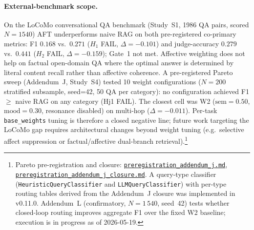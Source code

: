 \documentclass[11pt]{article}
\newcommand{\repourl}{https://github.com/gianlucamazza/emotional-memory}%
\begin{document}
\paragraph{External-benchmark scope.}
On the LoCoMo conversational QA benchmark (Study~S1, 1986 QA pairs, scored
$N=1540$) AFT underperforms naive RAG on both pre-registered co-primary
metrics: F1 $0.168$ vs.\ $0.271$ ($H_1$ FAIL, $\Delta=-0.101$) and
judge-accuracy $0.279$ vs.\ $0.441$ ($H_2$ FAIL, $\Delta=-0.159$);
Gate~1 not met. Affective weighting does not help on factual open-domain
QA where the optimal answer is determined by literal content recall
rather than affective coherence.
A pre-registered Pareto sweep (Addendum~J, Study~S4) tested 10 weight
configurations ($N=200$ stratified subsample, seed=42, 50 QA per category):
no configuration achieved F1 $\geq$ naive RAG on any category (Hj1 FAIL).
The closest cell was W2 ($\text{sem}=0.50$, $\text{mood}=0.30$, resonance
disabled) on multi-hop ($\Delta=-0.011$).
Per-task \texttt{base\_weights} tuning is therefore a closed negative line;
future work targeting the LoCoMo gap requires architectural changes beyond
weight tuning (e.g.\ selective affect suppression or factual/affective dual-branch
retrieval).\footnote{Pareto
pre-registration and closure:
\href{\repourl/blob/main/benchmarks/preregistration\_addendum\_j.md}%
{\texttt{preregistration\_addendum\_j.md}},
\href{\repourl/blob/main/benchmarks/preregistration\_addendum\_j\_closure.md}%
{\texttt{preregistration\_addendum\_j\_closure.md}}.
A query-type classifier (\texttt{HeuristicQueryClassifier} and
\texttt{LLMQueryClassifier}) with per-type routing tables derived from the
Addendum~J closure was implemented in v0.11.0.  Addendum~L (confirmatory,
$N=1\,540$, seed~42) tests whether closed-loop routing improves aggregate F1
over the fixed W2 baseline; execution is in progress as of 2026-05-19.}
\end{document}
